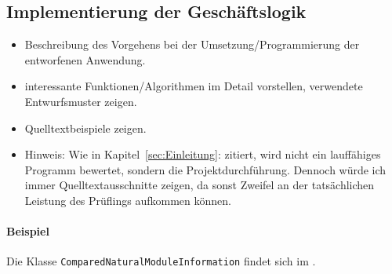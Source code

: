 \subsection{Implementierung der Geschäftslogik}
\label{sec:ImplementierungGeschaeftslogik}

\begin{itemize}
	\item Beschreibung des Vorgehens bei der Umsetzung/Programmierung der entworfenen Anwendung.
	\item \Ggfs interessante Funktionen/Algorithmen im Detail vorstellen, verwendete Entwurfsmuster zeigen.
	\item Quelltextbeispiele zeigen.
	\item Hinweis: Wie in Kapitel~\ref{sec:Einleitung}:  zitiert, wird nicht ein lauffähiges Programm bewertet, sondern die Projektdurchführung. Dennoch würde ich immer Quelltextausschnitte zeigen, da sonst Zweifel an der tatsächlichen Leistung des Prüflings aufkommen können.
\end{itemize}

\paragraph{Beispiel}
Die Klasse \texttt{Com\-par\-ed\-Na\-tu\-ral\-Mo\-dule\-In\-for\-ma\-tion} findet sich im .  
